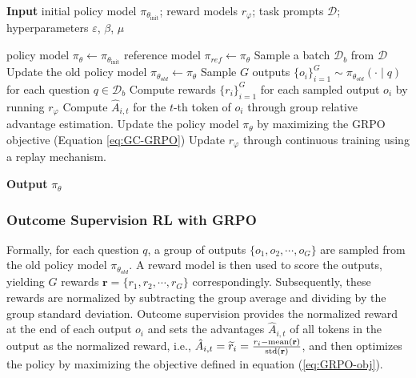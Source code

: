\begin{algorithm}[t]
  \small
  \caption{Iterative Group Relative Policy Optimization}
  \textbf{Input} initial policy model $\pi_{\theta_{\text{init}}}$; reward models $r_\varphi$; task prompts $\mathcal{D}$; 
  hyperparameters $\varepsilon$, $\beta$, $\mu$
  \begin{algorithmic}[1]
    \State policy model $\pi_\theta \leftarrow \pi_{\theta_{\text{init}}}$
       \State reference model $\pi_{ref} \leftarrow \pi_{\theta}$
      \State Sample a batch $\mathcal{D}_b$ from $\mathcal{D}$
      \State Update the old policy model $\pi_{\theta_{old}} \leftarrow \pi_{\theta}$ 
      \State Sample $G$ outputs $\{o_i\}_{i=1}^G \sim \pi_{\theta_{old}} (\cdot \mid q) $ for each question $q \in \mathcal{D}_b$
      \State Compute rewards $\{r_i\}_{i=1}^{G}$ for each sampled output $o_i$ by running $r_{\varphi}$ 
      \State Compute $\hat{A}_{i,t}$ for the $t$-th token of $o_i$ through group relative advantage estimation.
        \State Update the policy model $\pi_{\theta}$ by maximizing the GRPO objective (Equation \ref{eq:GC-GRPO})
      \EndFor
    \EndFor \State Update $r_\varphi$ through continuous training using a replay mechanism. 
    \EndFor 
  \end{algorithmic}
  \textbf{Output} $\pi_\theta$
  \label{alg:iter-grpo}
\end{algorithm}

\subsubsection{Outcome Supervision RL with GRPO} Formally, for each question $q$,  a group of outputs $\{o_1, o_2, \cdots, o_G\}$  are sampled from the old policy model $\pi_{\theta_{old}}$. A reward model is then used to score the outputs, yielding $G$ rewards  $\mathbf{r}=\{r_1, r_2, \cdots, r_G\}$ correspondingly. Subsequently, these rewards are normalized by subtracting the group average and dividing by the group standard deviation. Outcome supervision provides the normalized reward at the end of each output $o_i$  and sets the advantages  $\hat{A}_{i, t}$  of all tokens in the output as the normalized reward, i.e., $\hat{A}_{i, t} = \widetilde{r}_i = \frac{r_i- {\rm mean}(\mathbf{r})}{{\rm std}(\mathbf{r})}$, and then optimizes the policy by maximizing the objective defined in equation (\ref{eq:GRPO-obj}).

